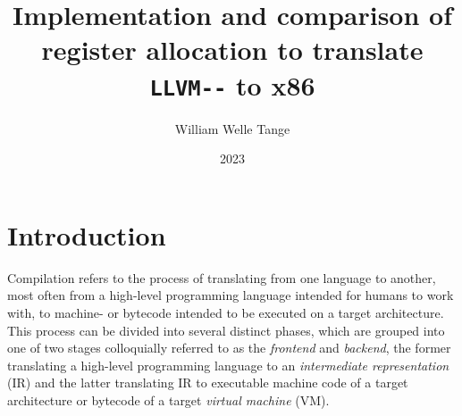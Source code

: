 \documentclass{article}
\title{Implementation and comparison of register allocation to translate \lstinline!LLVM--! to x86}
\author{William Welle Tange}
\date{2023}
\begin{document}
\maketitle

\tableofcontents
\newpage



    

\section{Introduction}

Compilation refers to the process of translating from one language to another, most often from a high-level programming language intended for humans to work with, to machine- or bytecode intended to be executed on a target architecture. This process can be divided into several distinct phases, which are grouped into one of two stages colloquially referred to as the \textit{frontend} and \textit{backend}, the former translating a high-level programming language to an \textit{intermediate representation} (IR) and the latter translating IR to executable machine code of a target architecture or bytecode of a target \textit{virtual machine} (VM).
\end{document}
